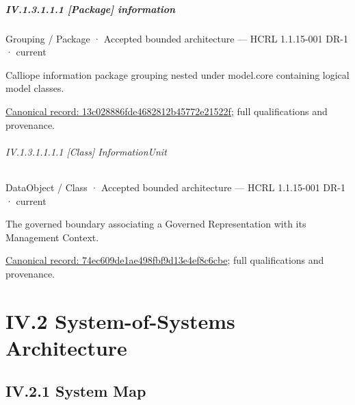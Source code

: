 \paragraph*{IV.1.3.1.1.1 [Package] information}
\label{navigation:IV.1.3.1.1.1}

\label{element:13c028886fde4682812b45772e21522f}
{\small Grouping / Package · Accepted bounded architecture — HCRL 1.1.15-001 DR-1 · current}\par

Calliope information package grouping nested under model.core containing logical model classes.


{\footnotesize \href{../../../../continuum/grouping/package/13c028886fde4682812b45772e21522f.md}{Canonical record: 13c028886fde4682812b45772e21522f}; full qualifications and provenance.}\par
\subparagraph*{IV.1.3.1.1.1.1 [Class] InformationUnit}
\label{navigation:IV.1.3.1.1.1.1}

\label{element:74ec609de1ae498fbf9d13e4ef8c6cbe}
{\small DataObject / Class · Accepted bounded architecture — HCRL 1.1.15-001 DR-1 · current}\par

The governed boundary associating a Governed Representation with its Management Context.


{\footnotesize \href{../../../../continuum/application/data-object/class/74ec609de1ae498fbf9d13e4ef8c6cbe.md}{Canonical record: 74ec609de1ae498fbf9d13e4ef8c6cbe}; full qualifications and provenance.}\par
\chapter*{IV.2 System-of-Systems Architecture}
\label{navigation:IV.2}

\section*{IV.2.1 System Map}
\label{navigation:IV.2.1}

